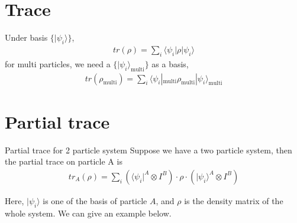 \documentclass[UTF8,12pt]{article} %
\begin{document}
\section{Trace}

Under basis $\{|\psi_{i}\rangle\}$,
\begin{align}
tr(\rho) = \sum_{i}\langle\psi_{i}|\rho|\psi_{i}\rangle
\end{align}
for multi particles, we need a $\{|\psi_{i}\rangle_{\text{multi}}\}$ as a basis,
\begin{align}
tr(\rho_{\text{multi}}) = \sum_{i}\langle\psi_{i}|_{\text{multi}}\rho_{\text{multi}}|\psi_{i}\rangle_{\text{multi}}
\end{align}

\section{Partial trace}

\begin{definition}{Partial trace for 2 particle system}{}\label{pt2}
Suppose we have a two particle system, then the partial trace on particle A is
\begin{align}
tr_{A}(\rho) = \sum_{i} \left(\langle\psi_{i}|^{A} \otimes I^{B}\right) \cdot \rho \cdot \left(|\psi_{i}\rangle^{A} \otimes I^{B}\right)
\end{align}
\end{definition}

Here, $|\psi_{i}\rangle$ is one of the basis of particle $A$, and $\rho$ is the density matrix of the whole system. We can give an example below.
\end{document}
